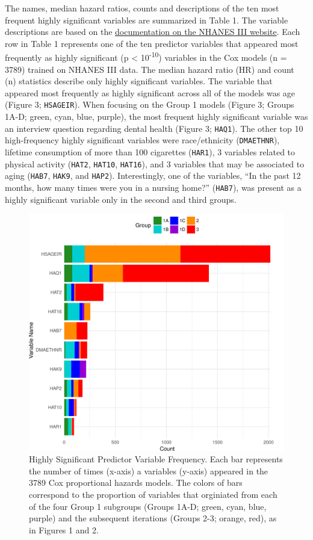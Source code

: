 \documentclass[12pt,oneside]{reedthesis}
\theoremstyle{definition}
\theoremstyle{definition}
\theoremstyle{definition}
\theoremstyle{remark}
\begin{document}
The names, median hazard ratios, counts and descriptions of the ten most
frequent highly significant variables are summarized in Table 1. The
variable descriptions are based on the
\href{https://wwwn.cdc.gov/nchs/nhanes/nhanes3/DataFiles.aspx}{documentation
on the NHANES III website}. Each row in Table 1 represents one of the
ten predictor variables that appeared most frequently as highly
significant (p \textless{} 10\textsuperscript{-10}) variables in the Cox
models (n = 3789) trained on NHANES III data. The median hazard ratio
(HR) and count (n) statistics describe only highly significant
variables. The variable that appeared most frequently as highly
significant across all of the models was age (Figure 3;
\texttt{HSAGEIR}). When focusing on the Group 1 models (Figure 3; Groups
1A-D; green, cyan, blue, purple), the most frequent highly significant
variable was an interview question regarding dental health (Figure 3;
\texttt{HAQ1}). The other top 10 high-frequency highly significant
variables were race/ethnicity (\texttt{DMAETHNR}), lifetime consumption
of more than 100 cigarettes (\texttt{HAR1}), 3 variables related to
physical activity (\texttt{HAT2}, \texttt{HAT10}, \texttt{HAT16}), and 3
variables that may be associated to aging (\texttt{HAB7}, \texttt{HAK9},
and \texttt{HAP2}). Interestingly, one of the variables, ``In the past
12 months, how many times were you in a nursing home?'' (\texttt{HAB7}),
was present as a highly significant variable only in the second and
third groups.
\begin{figure}
\centering
\includegraphics[width=\textwidth,height=0.6\textheight]{figure/3-varbar-final.pdf}
\caption{Highly Significant Predictor Variable Frequency. \break Each
bar represents the number of times (x-axis) a variables (y-axis)
appeared in the 3789 Cox proportional hazards models. The colors of bars
correspond to the proportion of variables that orginiated from each of
the four Group 1 subgroups (Groups 1A-D; green, cyan, blue, purple) and
the subsequent iterations (Groups 2-3; orange, red), as in Figures 1 and
2.}
\end{figure}
\end{document}
